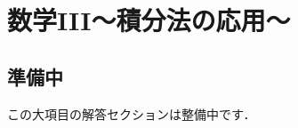 \documentclass[../../ms_a.tex]{subfiles}
\begin{document}
\section{数学III～積分法の応用～}

\subsection*{準備中}
この大項目の解答セクションは整備中です．
\end{document}
